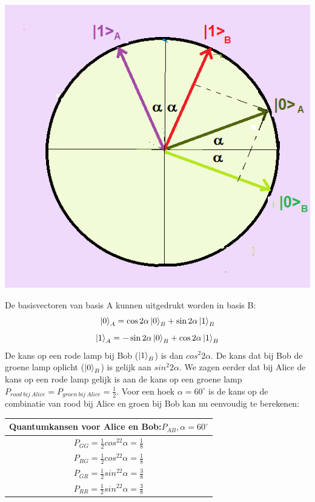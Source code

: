 \documentclass[../../main.tex]{subfiles}
\begin{document}
\begin{flushleft}
\begin{minipage}{.45\textwidth}
\includegraphics[width=\textwidth]{./img/belleenheidcirkel.png}
\end{minipage}%
\begin{minipage}{.55\textwidth}
\end{minipage}%
\end{flushleft}

De basisvectoren van basis A kunnen  uitgedrukt worden in basis B:
\[\ket{0}_A = \cos{2\alpha}\ket{0}_B  + \sin{2\alpha}\ket{1}_B\]
\[\ket{1}_A = -\sin{2\alpha}\ket{0}_B + \cos{2\alpha}\ket{1}_B\]
De kans op een rode lamp bij Bob ($\ket{1}_B$) is dan $cos^2{2\alpha}$. De kans dat bij Bob de groene lamp oplicht ($\ket{0}_B$) is gelijk aan $sin^2{2\alpha}$. We zagen eerder dat bij Alice de kans op een rode lamp gelijk is aan de kans op een groene lamp $P_{rood~bij~Alice}=P_{groen~bij~Alice}= \frac{1}{2}$. Voor een hoek $\alpha = 60^{\circ}$ is de kans op de combinatie van rood bij Alice en groen bij Bob kan nu eenvoudig te berekenen:

\begingroup%
\renewcommand{\arraystretch}{1.5} %
\begin{tabular}{|c|}
\hline
Quantumkansen voor Alice en Bob:$P_{AB}, \alpha=60^{\circ}$\\ \hline
$P_{GG}=\tfrac{1}{2}cos^22\alpha = \tfrac{1}{8}$\\ 
$P_{RG}=\tfrac{1}{2}cos^22\alpha = \tfrac{1}{8}$\\ 
$P_{GR}=\tfrac{1}{2}sin^22\alpha = \tfrac{3}{8}$\\ 
$P_{RR}=\tfrac{1}{2}sin^22\alpha = \tfrac{3}{8}$\\ \hline
\end{tabular}
\endgroup
\end{document}
